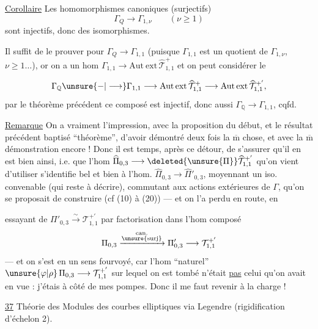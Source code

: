 \uline{Corollaire} Les homomorphismes canoniques (surjectifs)
\[
\tag{43}
\Gamma_Q\longrightarrow\Gamma_{1,\nu}\qquad(\nu\geq1)
\]
sont injectifs, donc des isomorphismes.

Il suffit de le prouver pour $\Gamma_Q\longrightarrow\Gamma_{1,1}$ (puisque $\Gamma_{1,1}$ est un quotient de $\Gamma_{1,\nu}$, $\nu\geq1\ldots$), or on a un hom  $\Gamma_{1,1}\longrightarrow\mathrm{Aut\ ext}\,\widehat{\mathcal T}_{1,1}^{+}$ et on peut considérer le 

\[
\Gamma_{\mathbb Q}\unsure{-|\longrightarrow}\Gamma_{1,1}
\longrightarrow \operatorname{Aut\,ext}\widehat{\mathcal T}_{1,1}^{+}
\longrightarrow \operatorname{Aut\,ext}\widehat{\mathcal T}_{1,1}^{+'},
\]
par le théorème précédent ce composé est injectif, donc aussi
$\Gamma_{\mathbb Q}\longrightarrow\Gamma_{1,1}$, cqfd.

\uline{Remarque} On a vraiment l'impression, avec la proposition du début, et
le résultat précédent baptisé ``théorème'', d'avoir démontré deux fois
la $\overline{\mathrm m}$ chose, et avec la $\overline{\mathrm m}$ démonstration
encore ! Donc il est temps, après ce détour, de s'assurer qu'il en est
bien ainsi, i.e. que l'hom
$\widehat{\Pi}_{0,3}\longrightarrow\deleted{\unsure{\Pi}}\widehat{\mathcal T}_{1,1}^{+'}$ qu'on vient d'utiliser
s'identifie bel et bien à l'hom.
$\widehat{\Pi}_{0,3}\longrightarrow\widehat{\Pi}'_{0,3}$,
moyennant un iso. convenable (qui reste à décrire),
commutant aux actions extérieures de $\Gamma$,
qu'on se proposait de construire (cf (10) à (20)) --- et on l'a
perdu en route, en

essayant de 
$\Pi'_{0,3}\xrightarrow{\sim}\mathcal T_{1,1}^{+'}$ par
factorisation dans l'hom composé
\[
\Pi_{0,3}\xrightarrow{\substack{\mathrm{can.}\\\unsure{\mathrm{surj}}}}
\Pi'_{0,3}\longrightarrow\mathcal T_{1,1}^{+'}
\]
--- et on s'est en un sens fourvoyé, car l'hom ``naturel''
$\unsure{\varphi|\rho}\,\Pi_{0,3}\longrightarrow\mathcal T_{1,1}^{+'}$
sur lequel on est tombé n'était \uline{pas}  celui qu'on avait
en vue : j'étais à côté de mes pompes. Donc il me faut revenir à la charge !

\uline{37} Théorie des Modules des courbes elliptiques via Legendre
(rigidification d'échelon 2). \unsure{)}

